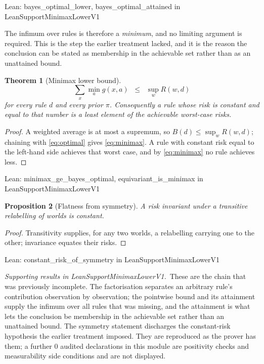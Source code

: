 \documentclass[conference]{IEEEtran}
\newtheorem{theorem}{Theorem}
\newtheorem{proposition}[theorem]{Proposition}
\theoremstyle{definition}
\newcommand{\lean}[1]{\textsf{\footnotesize #1}}
\newcommand{\leanbox}[1]{%
  \par\vspace{2pt}\noindent
  {\footnotesize\textsf{Lean: #1}}\par\vspace{2pt}}
\begin{document}
\leanbox{\lean{bayes\_optimal\_lower}, \lean{bayes\_optimal\_attained} in
\lean{LeanSupportMinimaxLowerV1}}

The infimum over rules is therefore a \emph{minimum}, and no limiting argument is required.
This is the step the earlier treatment lacked, and it is the reason the conclusion can be
stated as membership in the achievable set rather than as an unattained bound.

\begin{theorem}[Minimax lower bound]
\label{thm:minimax}
\begin{equation}
\sum_{x}\min_{a}g(x,a)\;\;\leq\;\;\sup_{w}R(w,d)
\label{eq:minimax}
\end{equation}
for every rule $d$ and every prior $\pi$. Consequently a rule whose risk is constant and equal
to that number is a least element of the achievable worst-case risks.
\end{theorem}

\begin{proof}
A weighted average is at most a supremum, so $B(d)\le\sup_{w}R(w,d)$; chaining with
\eqref{eq:optimal} gives \eqref{eq:minimax}. A rule with constant risk equal to the left-hand
side achieves that worst case, and by \eqref{eq:minimax} no rule achieves less.
\end{proof}

\leanbox{\lean{minimax\_ge\_bayes\_optimal}, \lean{equivariant\_is\_minimax} in
\lean{LeanSupportMinimaxLowerV1}}

\begin{proposition}[Flatness from symmetry]
\label{prop:symmetry}
A risk invariant under a transitive relabelling of worlds is constant.
\end{proposition}

\begin{proof}
Transitivity supplies, for any two worlds, a relabelling carrying one to the other;
invariance equates their risks.
\end{proof}

\leanbox{\lean{constant\_risk\_of\_symmetry} in \lean{LeanSupportMinimaxLowerV1}}

\noindent\emph{Supporting results in \lean{LeanSupportMinimaxLowerV1}.}~These are the chain that was previously incomplete. The factorisation separates an arbitrary rule's contribution observation by observation; the pointwise bound and its attainment supply the infimum over all rules that was missing, and the attainment is what lets the conclusion be membership in the achievable set rather than an unattained bound. The symmetry statement discharges the constant-risk hypothesis the earlier treatment imposed. They are reproduced as the prover has them; a further $0$ audited declarations in this module are positivity checks and measurability side conditions and are not displayed.
\end{document}
